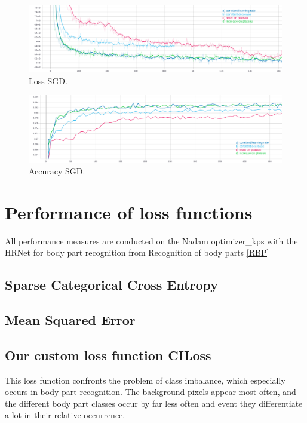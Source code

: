 \begin{figure}[H]
    \centering
    \includegraphics[width=\textwidth,height=\textheight,keepaspectratio]{img/loss_sgd.png}
    \decoRule
    \caption[Loss SGD]{Loss SGD.}
    \label{fig:sgd-loss}
\end{figure}

\begin{figure}[H]
    \centering
    \includegraphics[width=\textwidth,height=\textheight,keepaspectratio]{img/accuracy_sgd.png}
    \decoRule
    \caption[Accuracy SGD]{Accuracy SGD.}
    \label{fig:sgd-accuracy}
\end{figure}



\section{Performance of loss functions}
All performance measures are conducted on the Nadam optimizer\_kps with the HRNet for body part recognition from
Recognition of body parts \ref{RBP}

\subsection{Sparse Categorical Cross Entropy}

\subsection{Mean Squared Error}

\subsection{Our custom loss function CILoss}
This loss function confronts the problem of class imbalance, which especially occurs in body part recognition.
The background pixels appear most often, and the different body part classes occur by far less often and event they
differentiate a lot in their relative occurrence.

